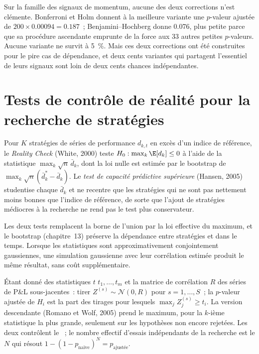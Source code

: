Sur la famille des signaux de momentum, aucune des deux corrections n'est clémente. Bonferroni et Holm donnent à la meilleure variante une $p$-valeur ajustée de $200
\times 0.00094 = 0.187$~; Benjamini--Hochberg donne 0.076, plus petite parce que sa procédure ascendante emprunte de la force aux 33 autres petites
$p$-valeurs. Aucune variante ne survit à 5~\%. Mais ces deux corrections ont été construites pour le pire cas de dépendance, et deux cents
variantes qui partagent l'essentiel de leurs signaux sont loin de deux cents chances indépendantes.

\section{Tests de contrôle de réalité pour la recherche de stratégies}

\begin{definition}\label{def:qm:testing-and-multiple-testing:rc}
Pour $K$ stratégies de séries de performance $d_{k,t}$ en excès d'un indice de référence, le \emph{Reality Check}
(White, 2000) teste $H_0: \max_k\E[d_k] \le 0$ à l'aide de la statistique $\max_k\sqrt n\,\bar d_k$, dont la loi nulle est estimée par
le bootstrap de $\max_k\sqrt n(\bar d_k^* - \bar d_k)$. Le \emph{test de capacité prédictive supérieure}
(Hansen, 2005) studentise chaque $\bar d_k$ et ne recentre que les stratégies qui ne sont pas nettement moins bonnes que l'indice de référence, de sorte
que l'ajout de stratégies médiocres à la recherche ne rend pas le test plus conservateur.
\end{definition}

Les deux tests remplacent la borne de l'union par la loi effective du maximum, et le bootstrap (chapitre~13) préserve la dépendance entre
stratégies et dans le temps. Lorsque les statistiques sont approximativement conjointement gaussiennes, une simulation gaussienne avec
leur corrélation estimée produit le même résultat, sans coût supplémentaire.

\begin{method}\label{met:qm:testing-and-multiple-testing:maxt}
Étant donné des statistiques $t$ $t_1, \dots, t_m$ et la matrice de corrélation $R$ des séries de P\&L sous-jacentes~: tirer $Z^{(s)} \sim \mathcal N(0, R)$
pour $s = 1, \dots, S$~; la $p$-valeur ajustée de $H_i$ est la part des tirages pour lesquels $\max_j Z_j^{(s)} \ge t_i$. La version
descendante (Romano et Wolf, 2005) prend le maximum, pour la $k$-ième statistique la plus grande, seulement sur les hypothèses non encore
rejetées. Les deux contrôlent le ~; le nombre effectif d'essais indépendants de la recherche est le $N$ qui résout $1 - (1 -
p_{\text{naïve}})^N = p_{\text{ajustée}}$.
\end{method}

